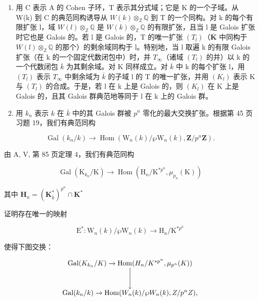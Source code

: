 \begin{enumerate}
\def\labelenumi{\alph{enumi})}
\item
  用 C 表示 A 的 Cohen 子环，T 表示其分式域；它是 K 的一个子域。从 W(k) 到 C 的典范同构诱导从 \(W(k) \otimes_{\mathbb{Z}} \mathbb{Q}\) 到 T 的一个同构。对 k 的每个有限扩张 l，域 \(W(l) \otimes_{\mathbb{Z}} \mathbb{Q}\) 是 \(W(k) \otimes_{\mathbb{Z}} \mathbb{Q}\) 的有限扩张，且当 l 是 Galois 扩张时它也是 Galois 的。若 l 是 Galois 的，T 的唯一扩张 \((T_l)\)（\(\overline{\mathbf{K}}\) 中同构于 \(W(l) \otimes_{\mathbb{Z}} \mathbb{Q}\) 的那个）的剩余域同构于 l。特别地，当 l 取遍 k 的有限 Galois 扩张（在 k 的一个固定代数闭包中）时，并 \(T_{\infty}\)（诸域 \((T_l)\) 的并）以 k 的一个代数闭包 \(\overline{k}\) 为其剩余域。对 K 同样成立。对 \(\overline{k}\) 中 k 的每个扩张 l，用 \((T_l)\) 表示 \(T_{\infty}\) 中剩余域为 \(\overline{k}\) 的子域 l 的 T 的唯一扩张，并用 \((K_l)\) 表示 K 与 \((T_l)\) 的合成。于是，若 l 在 k 上是 Galois 的，则 \((K_l)\) 在 K 上是 Galois 的，且其 Galois 群典范地等同于 l 在 k 上的 Galois 群。
\item
  用 \(k_n\) 表示 \(k\) 在 \(\overline{k}\) 中的其 Galois 群被 \(p^n\) 零化的最大交换扩张。根据第 45 页习题 19，我们有典范同构
\end{enumerate}

\[
\operatorname{Gal} (k _ {n} / k) \to \operatorname{Hom} (\mathrm{W} _ {n} (k) / \wp \mathrm{W} _ {n} (k), \mathbf {Z} / p ^ {n} \mathbf {Z}).
\]

由 A, V, 第 85 页定理 4，我们有典范同构

\[
\operatorname{Gal} \left(\mathrm{K} _ {k _ {n}} / \mathrm{K}\right)\rightarrow \operatorname{Hom} \left(\mathrm{H} _ {n} / \mathrm{K} ^ {* p ^ {n}}, \mu_ {p _ {n}} (\mathrm{K})\right)
\]

\(\text{其中 }\mathbf{H}_n = (\mathbf{K}_{\overline{k}}^*)^{p^n}\cap \mathbf{K}^*\)

证明存在唯一的映射

\[
\mathrm{E} ^ {*}: \mathrm{W} _ {n} (k) / \wp \mathrm{W} _ {n} (k) \rightarrow \mathrm{H} _ {n} / \mathrm{K} ^ {* p ^ {n}}
\]

使得下图交换：

\[
\begin{array}{c} \operatorname{Gal} (K _ {k _ {n}} / K) \xrightarrow {} \operatorname{Hom} (H _ {n} / K ^ {* p ^ {n}}, \mu_ {p ^ {n}} (K)) \\ \Bigg \downarrow \\ \operatorname{Gal} (k _ {n} / k) \xrightarrow {} \operatorname{Hom} (W _ {n} (k) / \wp W _ {n} (k), Z / p ^ {n} Z), \end{array}
\]

